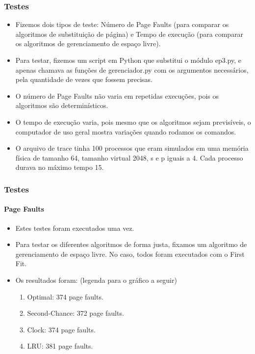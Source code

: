 \documentclass{beamer}
\begin{document}
\begin{frame}
	\frametitle{Testes}
	\begin{itemize}
		\item Fizemos dois tipos de teste: Número de Page Faults (para comparar os algoritmos de substituição de página) e Tempo de execução (para comparar os algoritmos de gerenciamento de espaço livre).
		\item Para testar, fizemos um script em Python que substitui o módulo ep3.py, e apenas chamava as funções de gerenciador.py com os argumentos necessários, pela quantidade de vezes que fossem precisas.
		\item O número de Page Faults não varia em repetidas execuções, pois os algoritmos são determinísticos.
		\item O tempo de execução varia, pois mesmo que os algoritmos sejam previsíveis, o computador de uso geral mostra variações quando rodamos os comandos.
		\item O arquivo de trace tinha 100 processos que eram simulados em uma memória física de tamanho 64, tamanho virtual 2048, s e p iguais a 4. Cada processo durava no máximo tempo 15.
	\end{itemize}
\end{frame}

\begin{frame}
	\frametitle{Testes}
	\framesubtitle{Page Faults}
	\begin{itemize}
		\item Estes testes foram executados uma vez.
		\item Para testar os diferentes algoritmos de forma justa, fixamos um algoritmo de gerenciamento de espaço livre. No caso, todos foram executados com o First Fit.
		\item Os resultados foram: (legenda para o gráfico a seguir)
		\begin{enumerate}
			\item Optimal: 374 page faults.
			\item Second-Chance: 372 page faults.
			\item Clock: 374 page faults.
			\item LRU: 381 page faults.
		\end{enumerate}
	\end{itemize}
\end{frame}
\end{document}
